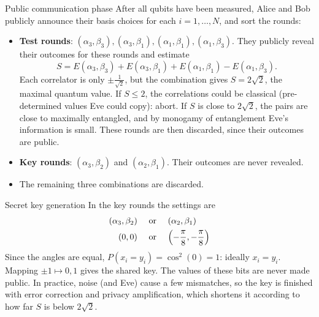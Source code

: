 \begin{parag}{Public communication phase}
    After all qubits have been measured, Alice and Bob publicly announce their basis choices for each $i = 1, \ldots, N$, and sort the rounds:
    \begin{itemize}
        \item \textbf{Test rounds}: $(\alpha_3, \beta_3), (\alpha_3, \beta_1), (\alpha_1, \beta_1), (\alpha_1, \beta_3)$. They publicly reveal their outcomes for these rounds and estimate
        \[
            S = E(\alpha_3, \beta_3) + E(\alpha_3, \beta_1) + E(\alpha_1, \beta_1) - E(\alpha_1, \beta_3).
        \]
        Each correlator is only $\pm\frac{1}{\sqrt{2}}$, but the combination gives $S = 2\sqrt{2}$, the maximal quantum value. If $S \leq 2$, the correlations could be classical (pre-determined values Eve could copy): abort. If $S$ is close to $2\sqrt{2}$, the pairs are close to maximally entangled, and by monogamy of entanglement Eve's information is small. These rounds are then discarded, since their outcomes are public.
        \item \textbf{Key rounds}: $(\alpha_3, \beta_2)$ and $(\alpha_2, \beta_1)$. Their outcomes are never revealed.
        \item The remaining three combinations are discarded.
    \end{itemize}
\end{parag}

\begin{parag}{Secret key generation}
    In the key rounds the settings are
    \begin{align*}
        \left(\alpha_3, \beta_2\right) \mathspace &\text{ or }\mathspace \left(\alpha_2, \beta_1\right) \\
        \left(0, 0\right) \mathspace &\text{ or } \mathspace \left(-\frac{\pi}{8}, -\frac{\pi}{8}\right)
    \end{align*}
    Since the angles are equal, $P(x_i = y_i) = \cos^2(0) = 1$: ideally $x_i = y_i$. Mapping $\pm 1 \mapsto 0, 1$ gives the shared key. The values of these bits are never made public. In practice, noise (and Eve) cause a few mismatches, so the key is finished with error correction and privacy amplification, which shortens it according to how far $S$ is below $2\sqrt{2}$.
\end{parag}




